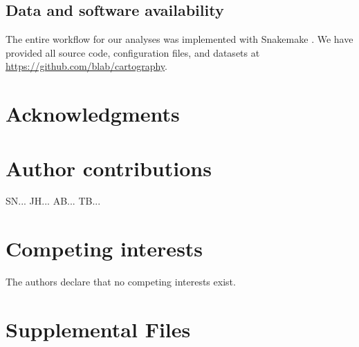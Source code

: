 \documentclass[9pt,lineno]{elife}
\begin{document}
\subsection*{Data and software availability}

The entire workflow for our analyses was implemented with Snakemake \citep{molder_2021}.
We have provided all source code, configuration files, and datasets at \href{https://github.com/blab/cartography}{https://github.com/blab/cartography}.

\section*{Acknowledgments}

\section*{Author contributions}

SN...
JH...
AB...
TB...

\section*{Competing interests}

The authors declare that no competing interests exist.

\section*{Supplemental Files}


\end{document}

